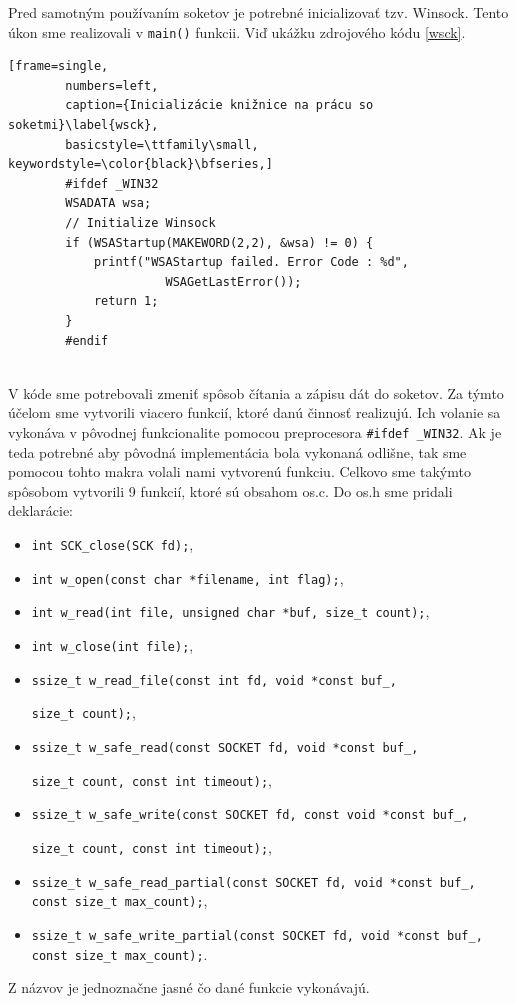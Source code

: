 Pred samotným používaním soketov je potrebné inicializovať tzv. Winsock. Tento úkon sme realizovali v \lstinline|main()| funkcii. Viď ukážku zdrojového kódu \ref{wsck}.

\begin{minipage}{\linewidth} 	
	\begin{lstlisting}[frame=single,
		numbers=left,
		caption={Inicializácie knižnice na prácu so soketmi}\label{wsck},
		basicstyle=\ttfamily\small, keywordstyle=\color{black}\bfseries,]
		#ifdef _WIN32
		WSADATA wsa;
		// Initialize Winsock
		if (WSAStartup(MAKEWORD(2,2), &wsa) != 0) {
			printf("WSAStartup failed. Error Code : %d",
				      WSAGetLastError());
			return 1;
		}
		#endif
	\end{lstlisting}
\end{minipage}\\

V kóde sme potrebovali zmeniť spôsob čítania a zápisu dát do soketov. Za týmto účelom sme vytvorili viacero funkcií, ktoré danú činnosť realizujú. Ich volanie sa vykonáva v pôvodnej funkcionalite pomocou preprocesora \lstinline|#ifdef _WIN32|. Ak je teda potrebné aby pôvodná implementácia bola vykonaná odlišne, tak sme pomocou tohto makra volali nami vytvorenú funkciu. Celkovo sme takýmto spôsobom vytvorili 9 funkcií, ktoré sú obsahom os.c. Do os.h sme pridali deklarácie:
\begin{itemize}
	\item\lstinline|int SCK_close(SCK fd);|,
	\item\lstinline|int w_open(const char *filename, int flag);|,
	\item\lstinline|int w_read(int file, unsigned char *buf, size_t count);|,
	\item\lstinline|int w_close(int file);|,
	\item\lstinline|ssize_t w_read_file(const int fd, void *const buf_,|
	 
					\lstinline|size_t count);|,
	\item\lstinline|ssize_t w_safe_read(const SOCKET fd, void *const buf_, | 
	
					\lstinline|size_t count, const int timeout);|,
	\item\lstinline|ssize_t w_safe_write(const SOCKET fd, const void *const buf_, |
	
					\lstinline|size_t count, const int timeout);|,
	\item\lstinline|ssize_t w_safe_read_partial(const SOCKET fd, void *const buf_, |
					\lstinline|const size_t max_count);|,
	\item\lstinline|ssize_t w_safe_write_partial(const SOCKET fd, void *const buf_,| 
					\lstinline|const size_t max_count);|.
\end{itemize}  
Z názvov je jednoznačne jasné čo dané funkcie vykonávajú.

